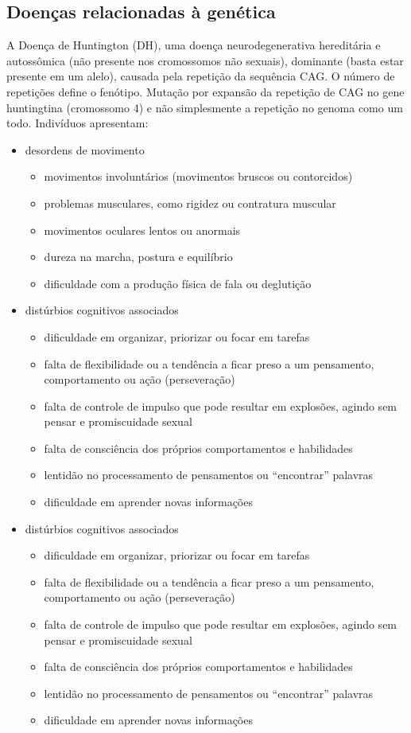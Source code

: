 \documentclass[
	article,			%
	12pt,				%
	oneside,			%
	a4paper,			%
	english,			%
	brazil,				%
	sumario=tradicional
	]{abntex2}
\begin{document}
\subsection{Doenças relacionadas à genética}
A Doença de Huntington (DH), uma doença neurodegenerativa hereditária e autossômica (não presente nos cromossomos não sexuais), dominante (basta estar presente em um alelo), causada pela repetição da sequência CAG. O número de repetições define o fenótipo. Mutação por expansão da repetição de CAG no gene huntingtina (cromossomo 4) e não simplesmente a repetição no genoma como um todo.
Indivíduos apresentam:
\begin{itemize}
    \item desordens de movimento
    	\begin{itemize}
			\item  movimentos involuntários (movimentos bruscos ou contorcidos)
			\item  problemas musculares, como rigidez ou contratura muscular
			\item  movimentos oculares lentos ou anormais
			\item  dureza na marcha, postura e equilíbrio
			\item  dificuldade com a produção física de fala ou deglutição
    	\end{itemize}
    
    \item distúrbios cognitivos associados
        \begin{itemize}
			\item dificuldade em organizar, priorizar ou focar em tarefas
			\item falta de flexibilidade ou a tendência a ficar preso a um pensamento, comportamento ou ação (perseveração) 
			\item falta de controle de impulso que pode resultar em explosões, agindo sem pensar e promiscuidade sexual
			\item falta de consciência dos próprios comportamentos e habilidades
			\item lentidão no processamento de pensamentos ou ``encontrar'' palavras
			\item dificuldade em aprender novas informações
		\end{itemize}
		
	\item distúrbios cognitivos associados
		\begin{itemize}
			\item dificuldade em organizar, priorizar ou focar em tarefas
			\item falta de flexibilidade ou a tendência a ficar preso a um pensamento, comportamento ou ação (perseveração) 
			\item falta de controle de impulso que pode resultar em explosões, agindo sem pensar e promiscuidade sexual
			\item falta de consciência dos próprios comportamentos e habilidades
			\item lentidão no processamento de pensamentos ou ``encontrar'' palavras
			\item dificuldade em aprender novas informações
		\end{itemize}
    

\end{itemize}
\end{document}
